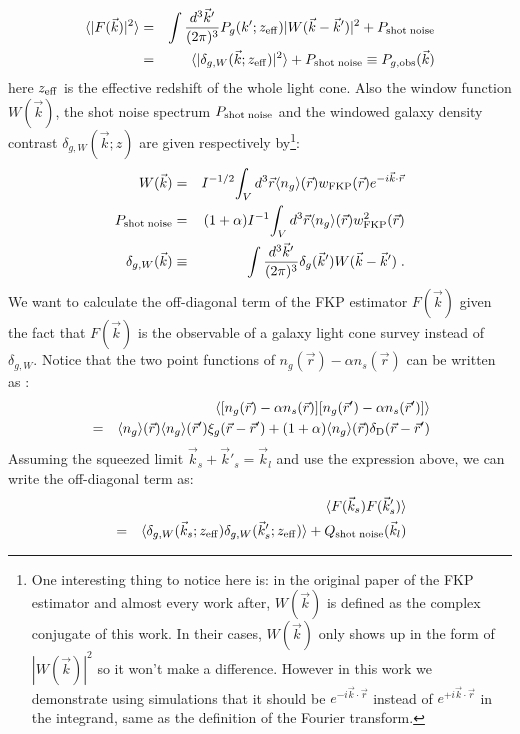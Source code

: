 \documentclass[prd,amsmath,amssymb,floatfix,superscriptaddress,nofootinbib,twocolumn]{revtex4-1}
\newcommand{\vs}{\nonumber\\}
\newcommand{\vk}{\vec{k}}
\newcommand{\eql}[1]{\label{eq:#1}}
\begin{document}
\begin{eqnarray}
\langle |F(\vec{k})|^{2}\rangle &=&\int \frac{d^{3}\vec{k}'}{(2\pi)^3}P_{g}(k';z_{\rm eff})|W(\vec{k}-\vec{k}')|^2+P_{\rm shot \; noise}\nonumber\\
&=&\langle |\delta_{g,W}(\vec{k};z_{\rm eff})|^2 \rangle+P_{\rm shot \; noise}\equiv P_{g,\rm obs}(\vec{k})
\end{eqnarray}
here $z_{\rm eff}$ is the effective redshift of the whole light cone. Also the window function $W(\vk)$, the shot noise spectrum $P_{\rm shot \; noise}$ and the windowed galaxy density contrast $\delta_{g,W}(\vk;z)$ are given respectively by\footnote{One interesting thing to notice here is: in the original paper of the FKP estimator \cite{Feldman:1993ky} and almost every work after, $W(\vk)$ is defined as the complex conjugate of this work. In their cases, $W(\vk)$ only shows up in the form of $|W(\vk)|^2$ so it won't make a difference. However in this work we demonstrate using simulations that it should be $e^{-i\vec{k}\cdot \vec{r}}$ instead of $e^{+i\vec{k}\cdot \vec{r}}$ in the integrand, same as the definition of the Fourier transform.}:
\begin{eqnarray}
W(\vec{k})&= &I^{-1/2}{\int_{V} d^{3}\vec{r} \langle n_{g}\rangle(\vec{r})w_{\rm FKP}(\vec{r})e^{-i\vec{k}\cdot \vec{r}}  }\eql{WinF}\\
P_{\rm shot \; noise}&=&(1+\alpha)I^{-1}{\int_{V}d^{3}\vec{r} \langle n_{g}\rangle (\vec{r}) w_{\rm FKP}^{2}(\vec{r})}\\
\delta_{g,W}(\vec{k})&\equiv& \int \frac{d^{3}\vec{k}'}{(2\pi)^3} \delta_{g}(\vec{k}')W(\vec{k}-\vec{k}')\eql{WinD}\;.
\end{eqnarray}
We want to calculate the off-diagonal term of the FKP estimator $F(\vk)$ given the fact that $F(\vk)$ is the observable of a galaxy light cone survey instead of $\delta_{g,W}$. Notice that the two point functions of $n_{g}(\vec{r})-\alpha n_{s}(\vec{r})$ can be written as \cite{Feldman:1993ky}:
\begin{eqnarray}
&&\langle [n_{g}(\vec{r})-\alpha n_{s}(\vec{r})][n_{g}(\vec{r}')-\alpha n_{s}(\vec{r}')]\rangle\nonumber\\
&=&\langle n_{g}\rangle(\vec{r})\langle n_{g}\rangle(\vec{r}')\xi_{g}(\vec{r}-\vec{r}')+(1+\alpha)\langle n_{g}\rangle(\vec{r})\delta_{\rm D}(\vec{r}-\vec{r}')\vs
\end{eqnarray}
Assuming the squeezed limit $\vec{k}_s+\vec{k}'_s=\vec{k}_l$ and use the expression above, we can write the off-diagonal term as:
\begin{eqnarray}
&&\langle F(\vec{k}_s)F(\vec{k}'_s)\rangle\nonumber\\
&=&\langle \delta_{g,W}(\vec{k}_s;z_{\rm eff})\delta_{g,W}(\vec{k}'_s;z_{\rm eff}) \rangle+Q_{\rm shot \; noise}(\vec{k}_l)
\end{eqnarray}
\end{document}
